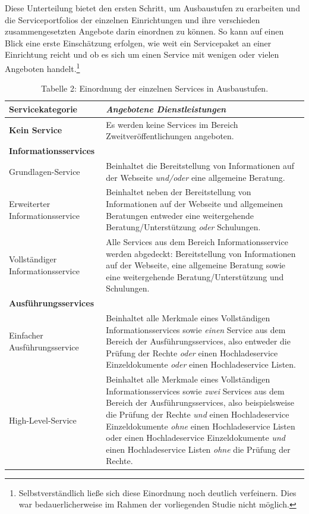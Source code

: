 \documentclass[a4paper,
fontsize=11pt,
oneside,
numbers=noperiodatend,
parskip=half-,
bibliography=totoc,
final
]{scrartcl}
\begin{document}
Diese Unterteilung bietet den ersten Schritt, um Ausbaustufen zu
erarbeiten und die Serviceportfolios der einzelnen Einrichtungen und
ihre verschieden zusammengesetzten Angebote darin einordnen zu können.
So kann auf einen Blick eine erste Einschätzung erfolgen, wie weit ein
Servicepaket an einer Einrichtung reicht und ob es sich um einen Service
mit wenigen oder vielen Angeboten handelt.\footnote{Selbstverständlich
  ließe sich diese Einordnung noch deutlich verfeinern. Dies war
  bedauerlicherweise im Rahmen der vorliegenden Studie nicht möglich.}


\begin{table}[h!]
\caption{Tabelle 2: Einordnung der einzelnen Services in Ausbaustufen.}
    \begin{tabular}{lp{9cm}}
    \toprule
    \textbf{Servicekategorie}                 & \textit{Angebotene Dienstleistungen} \\
    \midrule
    \textbf{Kein Service}                        & Es werden keine Services im Bereich Zweitveröffentlichungen angeboten.  \\ 
    \midrule
    \textbf{Informationsservices}           & ~  \\
    Grundlagen-Service                        & Beinhaltet die Bereitstellung von Informationen auf der Webseite \textit{und/oder} eine allgemeine Beratung.\\
    Erweiterter Informationsservice      & Beinhaltet neben der Bereitstellung von Informationen auf der Webseite und allgemeinen Beratungen entweder eine weitergehende Beratung/Unterstützung \textit{oder} Schulungen.  \\
    Vollständiger Informationsservice   & Alle Services aus dem Bereich Informationsservice werden abgedeckt: Bereitstellung von Informationen auf der Webseite, eine allgemeine Beratung sowie eine weitergehende Beratung/Unterstützung und Schulungen. \\ 
    \midrule
    \textbf{Ausführungsservices}                     & ~    \\
    Einfacher Ausführungsservice      & Beinhaltet alle Merkmale eines Vollständigen Informationsservices sowie \textit{einen} Service aus dem Bereich der Ausführungsservices, also entweder die Prüfung der Rechte \textit{oder} einen Hochladeservice Einzeldokumente \textit{oder} einen Hochladeservice Listen.                                                                                                              \\
    High-Level-Service                      & Beinhaltet alle Merkmale eines Vollständigen Informationsservices sowie \textit{zwei} Services aus dem Bereich der Ausführungsservices, also beispielsweise die Prüfung der Rechte \textit{und} einen Hochladeservice Einzeldokumente \textit{ohne} einen Hochladeservice Listen oder einen Hochladeservice Einzeldokumente \textit{und} einen Hochladeservice Listen \textit{ohne} die Prüfung der Rechte. \\

\end{tabular}
\end{table}
\end{document}

